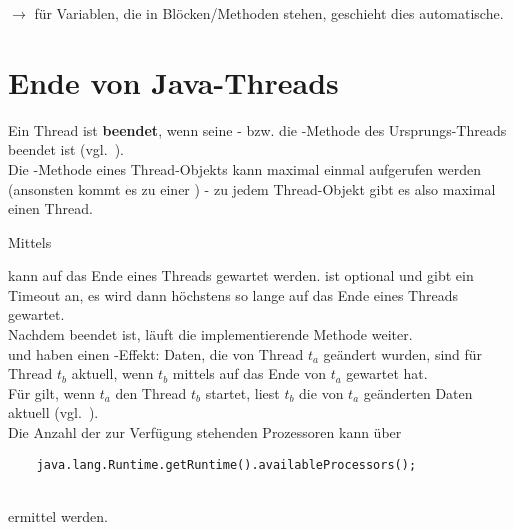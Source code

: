 $\rightarrow$ für Variablen, die in  Blöcken/Methoden stehen, geschieht dies automatische.

\section{Ende von Java-Threads}

Ein Thread ist \textbf{beendet}, wenn seine - bzw. die -Methode des Ursprungs-Threads beendet ist (vgl.~\cite[33]{Oec22}).\\

Die -Methode eines Thread-Objekts kann maximal einmal aufgerufen werden (ansonsten kommt es zu einer ) - zu jedem Thread-Objekt gibt es also maximal einen Thread.

Mittels

\begin{center}
     
\end{center}
kann auf das Ende eines Threads gewartet werden.
 ist optional und gibt ein Timeout an, es wird dann höchstens so lange auf das Ende eines Threads gewartet.\\
Nachdem  beendet ist, läuft die implementierende Methode weiter.\\

 und  haben einen -Effekt: Daten, die von Thread $t_a$ geändert wurden, sind für Thread $t_b$ aktuell, wenn $t_b$ mittels  auf das Ende von $t_a$ gewartet hat.\\
Für  gilt, wenn $t_a$ den Thread $t_b$ startet, liest $t_b$ die von $t_a$ geänderten Daten aktuell (vgl.~\cite[37]{Oec22}).\\

Die Anzahl der zur Verfügung stehenden Prozessoren kann über

\begin{verbatim}
    java.lang.Runtime.getRuntime().availableProcessors();
\end{verbatim}\\

ermittel werden.\\

